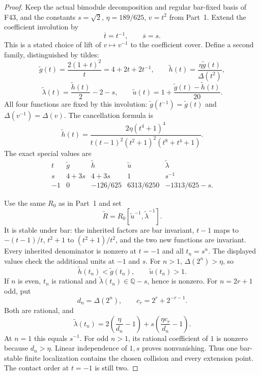 \documentclass[11pt,a4paper]{article}
\newcommand{\Q}{\mathbb Q}\newcommand{\Z}{\mathbb Z}\newcommand{\C}{\mathbb C}\newcommand{\N}{\mathbb N}\newcommand{\F}{\mathbb F}
\newcommand{\fid}[1]{\textsf{#1}}\newcommand{\gate}[1]{\textsf{#1}}
\theoremstyle{named}\newtheorem{finding}{Finding}[section]
\theoremstyle{definition}\newtheorem{definition}[finding]{Definition}
\theoremstyle{remark}\newtheorem{remark}[finding]{Remark}
\begin{document}
\begin{proof}
Keep the actual bimodule decomposition and regular
bar-fixed basis of \fid{F43}, and the constants
$s=\sqrt2$, $\eta=189/625$, $v=t^2$ from Part~1.
Extend the coefficient involution by
\[
 \overline t=t^{-1},\qquad \overline s=s.
\]
This is a stated choice of lift of $v\mapsto v^{-1}$
to the coefficient cover.
Define a second family, distinguished by tildes:
\[
 \widetilde g(t)=\frac{2(1+t)^2}{t}
                  =4+2t+2t^{-1},\qquad
 \widetilde h(t)=\frac{\eta\widetilde g(t)}{\Delta(t^2)},
\]
\begin{equation}\label{eq:barfractionalfunctions}
 \widetilde\lambda(t)=\frac{\widetilde h(t)}2-2-s,\qquad
 \widetilde u(t)=1+\frac{\widetilde g(t)-\widetilde h(t)}{20}.
\end{equation}
All four functions are fixed by this involution:
$\widetilde g(t^{-1})=\widetilde g(t)$ and
$\Delta(v^{-1})=\Delta(v)$.
The cancellation formula is
\[
 \widetilde h(t)=
 \frac{2\eta(t^4+1)^4}
 {t(t-1)^2(t^2+1)^2(t^8+t^4+1)}.
\]
The exact special values are
\[
\begin{array}{c|cccc}
t&\widetilde g&\widetilde h&\widetilde u&
                                   \widetilde\lambda\\ \hline
s&4+3s&4+3s&1&s^{-1}\\
-1&0&-126/625&6313/6250&-1313/625-s .
\end{array}
\]

Use the same $R_0$ as in Part~1 and set
\[
 \widetilde R
   =R_0[\widetilde u^{-1},\widetilde\lambda^{-1}].
\]
It is stable under bar: the inherited factors are
bar invariant, $t-1$ maps to $-(t-1)/t$,
$t^2+1$ to $(t^2+1)/t^2$, and the two new functions
are invariant.
Every inherited denominator is nonzero at $t=-1$
and all $t_n=s^n$.
The displayed values check the additional units
at $-1$ and $s$.
For $n>1$, $\Delta(2^n)>\eta$, so
\[
 \widetilde h(t_n)<\widetilde g(t_n),\qquad
 \widetilde u(t_n)>1.
\]
If $n$ is even, $t_n$ is rational and
$\widetilde\lambda(t_n)\in\Q-s$, hence is nonzero.
For $n=2r+1$ odd, put
\[
 d_n=\Delta(2^n),\qquad c_r=2^r+2^{-r-1}.
\]
Both are rational, and
\[
 \widetilde\lambda(t_n)
 =2\left(\frac{\eta}{d_n}-1\right)
   +s\left(\frac{\eta c_r}{d_n}-1\right).
\]
At $n=1$ this equals $s^{-1}$.
For odd $n>1$, its rational coefficient of $1$
is nonzero because $d_n>\eta$.
Linear independence of $1,s$ proves nonvanishing.
Thus one bar-stable finite localization contains the
chosen collision and every extension point.
The contact order at $t=-1$ is still two.


\end{proof}
\end{document}
